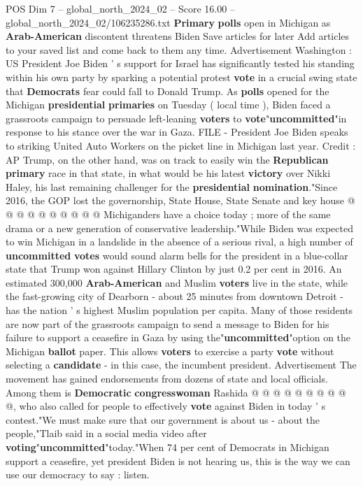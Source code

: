 \begin{textsample}{POS Dim 7 – global\_north\_2024\_02 – Score 16.00 – global\_north\_2024\_02/106235286.txt}  \label{ex:f7_pos_022}
\textbf{Primary} \textbf{polls} open in Michigan as \textbf{Arab-American} discontent threatens Biden Save articles for later Add articles to your saved list and come back to them any time.
Advertisement Washington : US President Joe Biden ' s support for Israel has significantly tested his standing within his own party by sparking a potential protest \textbf{vote} in a crucial swing state that \textbf{Democrats} fear could fall to Donald Trump.
As \textbf{polls} opened for the Michigan \textbf{presidential} \textbf{primaries} on Tuesday ( local time ), Biden faced a grassroots campaign to persuade left-leaning \textbf{voters} to \textbf{vote}"\textbf{uncommitted}"in response to his stance over the war in Gaza.
FILE - President Joe Biden speaks to striking United Auto Workers on the picket line in Michigan last year.
Credit : AP Trump, on the other hand, was on track to easily win the \textbf{Republican} \textbf{primary} race in that state, in what would be his latest \textbf{victory} over Nikki Haley, his last remaining challenger for the \textbf{presidential} \textbf{nomination}."Since 2016, the GOP lost the governorship, State House, State Senate and key house @ @ @ @ @ @ @ @ @ @ Michiganders have a choice today ; more of the same drama or a new generation of conservative leadership."While Biden was expected to win Michigan in a landslide in the absence of a serious rival, a high number of \textbf{uncommitted} \textbf{votes} would sound alarm bells for the president in a blue-collar state that Trump won against Hillary Clinton by just 0.2 per cent in 2016.
An estimated 300,000 \textbf{Arab-American} and Muslim \textbf{voters} live in the state, while the fast-growing city of Dearborn - about 25 minutes from downtown Detroit - has the nation ' s highest Muslim population per capita.
Many of those residents are now part of the grassroots campaign to send a message to Biden for his failure to support a ceasefire in Gaza by using the"\textbf{uncommitted}"option on the Michigan \textbf{ballot} paper.
This allows \textbf{voters} to exercise a party \textbf{vote} without selecting a \textbf{candidate} - in this case, the incumbent president.
Advertisement The movement has gained endorsements from dozens of state and local officials.
Among them is \textbf{Democratic} \textbf{congresswoman} Rashida @ @ @ @ @ @ @ @ @ @, who also called for people to effectively \textbf{vote} against Biden in today ' s contest."We must make sure that our government is about us - about the people,"Tlaib said in a social media video after \textbf{voting}"\textbf{uncommitted}"today."When 74 per cent of Democrats in Michigan support a ceasefire, yet president Biden is not hearing us, this is the way we can use our democracy to say : listen.

\end{textsample}
